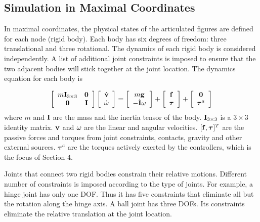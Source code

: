 \subsection{Simulation in Maximal Coordinates}

In maximal coordinates, the physical states of the articulated figures are defined for each node (rigid body). Each body has six degrees of freedom: three translational and three rotational. The dynamics of each rigid body is considered independently. A list of additional joint constraints is imposed to ensure that the two adjacent bodies will stick together at the joint location. The dynamics equation for each body is 

\begin{equation}
\left[\begin{array}{cc}
m\vc{I}_{3\times3} & \vc{0} \\
\vc{0} & \vc{I}
\end{array}\right]
\left[\begin{array}{c}
\dot{\vc{v}} \\
\dot{\vc{\omega}}
\end{array}\right]=
\left[\begin{array}{c}
m\vc{g} \\
-\dot{\vc{I}}\vc{\omega}
\end{array}\right]
+\left[\begin{array}{c}
\vc{f}\\
\boldsymbol{\tau}
\end{array}\right]
+
\left[\begin{array}{c}
\vc{0}\\
\boldsymbol{\tau}^a
\end{array}\right]
\label{eq:dynamics}
\end{equation}
where $m$ and $\mathbf{I}$ are the mass and the inertia tensor of the body. $\mathbf{I}_{3\times 3}$ is a $3\times 3$ identity matrix. $\mathbf{v}$ and $\mathbf{\omega}$ are the linear and angular velocities. $[\mathbf{f}, \boldsymbol{\tau}]^T$ are the passive forces and torques from joint constraints, contacts, gravity and other external sources. $\boldsymbol{\tau}^a$ are the torques actively exerted by the controllers, which is the focus of Section 4.

Joints that connect two rigid bodies constrain their relative motions. Different number of constraints is imposed according to the type of joints. For example, a hinge joint has only one DOF. Thus it has five constraints that eliminate all but the rotation along the hinge axis. A ball joint has three DOFs. Its constraints eliminate the relative translation at the joint location. 

